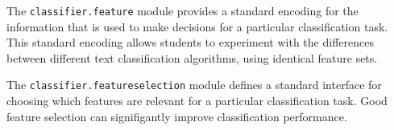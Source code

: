 \documentclass[11pt]{article}
\begin{document}
The \texttt{classifier.feature} module provides a standard encoding
for the information that is used to make decisions for a particular
classification task.  This standard encoding allows students to
experiment with the differences between different text classification
algorithms, using identical feature sets.

The \texttt{classifier.featureselection} module defines a standard
interface for choosing which features are relevant for a particular
classification task.  Good feature selection can signifigantly improve
classification performance.









\end{document}
